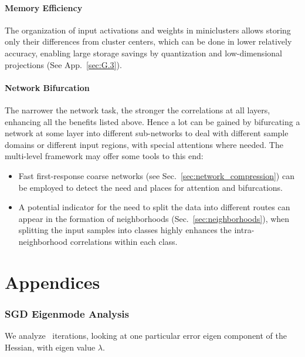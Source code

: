 \documentclass{article} %
\begin{document}
\subsection{Memory Efficiency}
\label{sec:memory_efficiency}
The organization of input activations and weights in miniclusters allows storing only their differences from cluster centers, which can be done in lower relatively accuracy, enabling large storage savings by quantization and low-dimensional projections (See App.~\ref{sec:G.3}).

\subsection{Network Bifurcation}
\label{sec:bifurcation}
The narrower the network task, the stronger the correlations at all layers, enhancing all the benefits listed above. Hence a lot can be gained by bifurcating a network at some layer into different sub-networks to deal with different sample domains or different input regions, with special attentions where needed. The multi-level framework may offer some tools to this end:
\begin{itemize}
	\item Fast first-response coarse networks (see Sec.~\ref{sec:network_compression}) can be employed to detect the need and places for attention and bifurcations.
	\item A potential indicator for the need to split the data into different routes can appear in the formation of neighborhoods (Sec.~\ref{sec:neighborhoods}), when splitting the input samples into classes highly enhances the intra-neighborhood correlations within each class.
\end{itemize}


\newpage
\part{Appendices}

\appendix

\section{SGD Eigenmode Analysis}
\label{sec:sgd_eigenmode}
We analyze \SGD~iterations, looking at one particular error eigen component of the Hessian, with eigen value $\lambda$.
\end{document}
